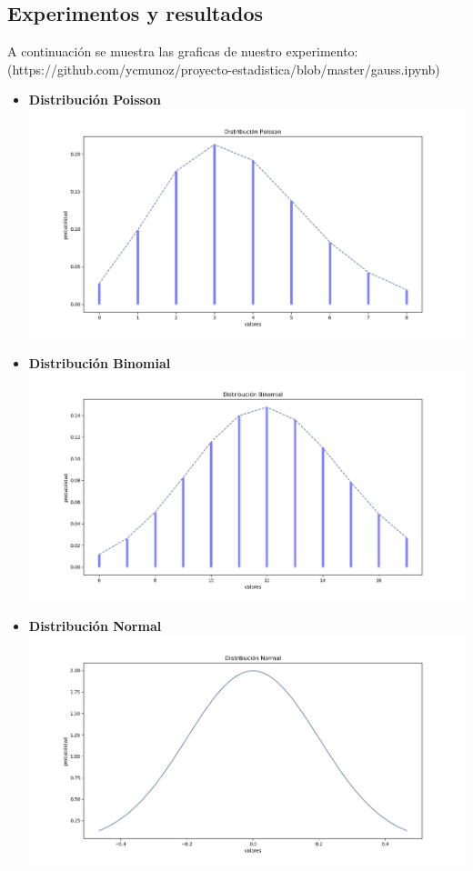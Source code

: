 \documentclass[12pt,a4paper]{article}
\begin{document}
\begin{multicols}{2}
\section{Experimentos y resultados}
    A continuación se muestra las graficas de nuestro experimento:\\
    (https://github.com/ycmunoz/proyecto-estadistica/blob/master/gauss.ipynb)
    \begin{itemize}
        \item \textbf{Distribución Poisson}\\
        \includegraphics[scale=0.25]{poisson.png}
        \item \textbf{Distribución Binomial}\\
        \includegraphics[scale=0.25]{binomial.png}
        \item \textbf{Distribución Normal}\\
        \includegraphics[scale=0.25]{normal.png}
    \end{itemize}


\end{multicols}
\end{document}
